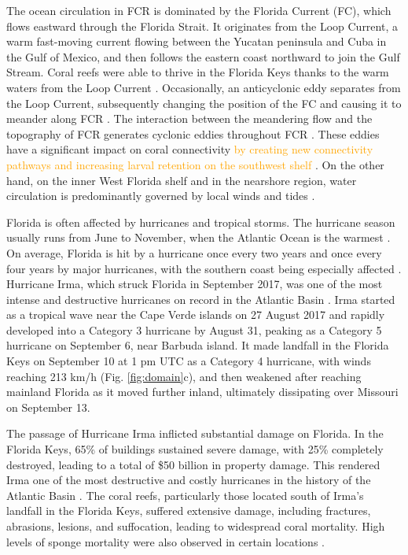 \documentclass[fleqn,10pt]{wlscirep}
\newcommand{\modif}[1]{\textcolor{orange}{#1}}
\begin{document}
The ocean circulation in FCR is dominated by the Florida Current (FC), which flows eastward through the Florida Strait. It originates from the Loop Current, a warm fast-moving current flowing between the Yucatan peninsula and Cuba in the Gulf of Mexico, and then follows the eastern coast northward to join the Gulf Stream. Coral reefs were able to thrive in the Florida Keys thanks to the warm waters from the Loop Current \citep{Donahue2008Jan}. Occasionally, an anticyclonic eddy separates from the Loop Current, subsequently changing the position of the FC and causing it to meander along FCR \citep{Leipper1970Jan,Vukovich1988Dec}. The interaction between the meandering flow and the topography of FCR generates cyclonic eddies throughout FCR \citep{Kourafalou2012May}. These eddies have a significant impact on coral connectivity \modif{by creating new connectivity pathways \citep{Limouzy-Paris1997Jul} and increasing larval retention on the southwest shelf \citep{Lee1994May}}. On the other hand, on the inner West Florida shelf and  in the nearshore region, water circulation is predominantly governed by local winds and tides \citep{Lee2002Jun,Sponaugle2007Feb}.

Florida is often affected by hurricanes and tropical storms. The hurricane season usually runs from June to November, when the Atlantic Ocean is the warmest \citep{Neumann1999}. On average, Florida is hit by a hurricane once every two years and once every four years by major hurricanes, with the southern coast being especially affected \citep{Malmstadt2009Jan,IFAS2021Aug}. Hurricane Irma, which struck Florida in September 2017, was one of the most intense and destructive hurricanes on record in the Atlantic Basin \citep{Cangialosi2018,Xian2018Jul}. Irma started as a tropical wave near the Cape Verde islands on 27 August 2017 and rapidly developed into a Category 3 hurricane by August 31, peaking as a Category 5 hurricane on September 6, near Barbuda island. It made landfall in the Florida Keys on September 10 at 1 pm UTC as a Category 4 hurricane, with winds reaching 213 km/h (Fig. \ref{fig:domain}c), and then weakened after reaching mainland Florida as it moved further inland, ultimately dissipating over Missouri on September 13.

The passage of Hurricane Irma inflicted substantial damage on Florida. In the Florida Keys, 65\% of buildings sustained severe damage, with 25\% completely destroyed, leading to a total of \$50 billion in property damage. This rendered Irma one of the most destructive and costly hurricanes in the history of the Atlantic Basin \citep{Cangialosi2018,NOAAcost}. The coral reefs, particularly those located south of Irma's landfall in the Florida Keys, suffered extensive damage, including fractures, abrasions, lesions, and suffocation, leading to widespread coral mortality. High levels of sponge mortality were also observed in certain locations \citep{NOAAirma2022Aug}. %
\end{document}
